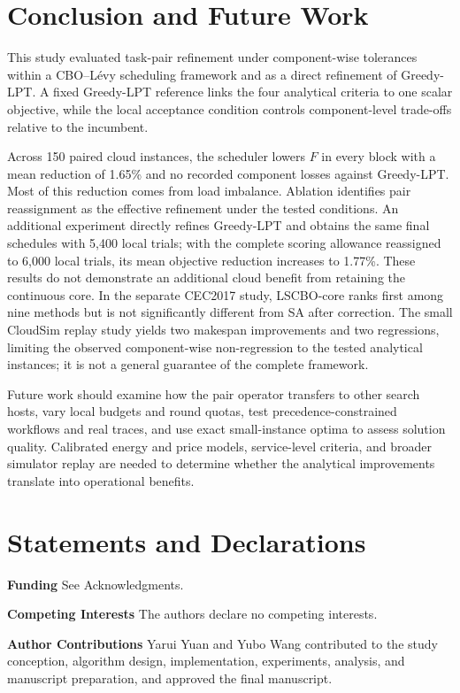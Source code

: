 \documentclass[pdflatex,onecolumn,sn-mathphys-num]{sn-jnl}
\begin{document}
\section{Conclusion and Future Work}\label{sec7}

This study evaluated task-pair refinement under component-wise tolerances within a CBO--L\'{e}vy scheduling framework and as a direct refinement of Greedy-LPT. A fixed Greedy-LPT reference links the four analytical criteria to one scalar objective, while the local acceptance condition controls component-level trade-offs relative to the incumbent.

Across 150 paired cloud instances, the scheduler lowers $F$ in every block with a mean reduction of 1.65\% and no recorded component losses against Greedy-LPT. Most of this reduction comes from load imbalance. Ablation identifies pair reassignment as the effective refinement under the tested conditions. An additional experiment directly refines Greedy-LPT and obtains the same final schedules with 5,400 local trials; with the complete scoring allowance reassigned to 6,000 local trials, its mean objective reduction increases to 1.77\%. These results do not demonstrate an additional cloud benefit from retaining the continuous core. In the separate CEC2017 study, LSCBO-core ranks first among nine methods but is not significantly different from SA after correction. The small CloudSim replay study yields two makespan improvements and two regressions, limiting the observed component-wise non-regression to the tested analytical instances; it is not a general guarantee of the complete framework.

Future work should examine how the pair operator transfers to other search hosts, vary local budgets and round quotas, test precedence-constrained workflows and real traces, and use exact small-instance optima to assess solution quality. Calibrated energy and price models, service-level criteria, and broader simulator replay are needed to determine whether the analytical improvements translate into operational benefits.

\section*{Statements and Declarations}
\textbf{Funding} See Acknowledgments.

\textbf{Competing Interests} The authors declare no competing interests.

\textbf{Author Contributions} Yarui Yuan and Yubo Wang contributed to the study conception, algorithm design, implementation, experiments, analysis, and manuscript preparation, and approved the final manuscript.
\end{document}
